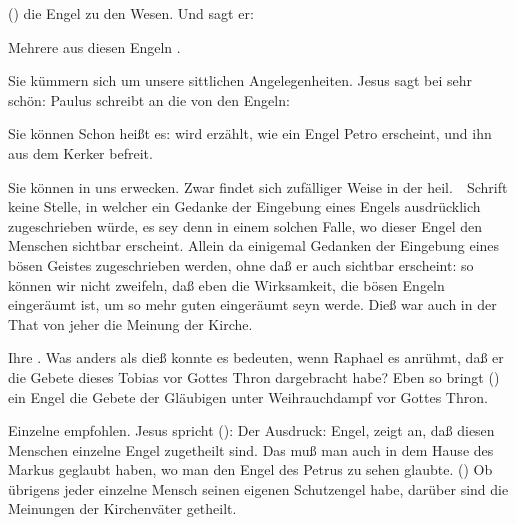 \begin{aufza}
\begin{aufzb}
() die Engel zu den  Wesen. Und  sagt er: 
\end{aufzb}
\item Mehrere aus diesen Engeln .
\begin{aufzb}
\item Sie kümmern sich um unsere sittlichen Angelegenheiten. Jesus sagt bei  sehr schön:  Paulus schreibt an die  von den Engeln: 
\item Sie können  Schon  heißt es:   wird erzählt, wie ein Engel Petro erscheint, und ihn aus dem Kerker befreit.
\item Sie können  in uns erwecken. Zwar findet sich zufälliger Weise in der heil.~\ Schrift keine Stelle, in welcher ein  Gedanke der Eingebung eines Engels ausdrücklich zugeschrieben würde, es sey denn in einem solchen Falle, wo dieser Engel den Menschen sichtbar erscheint. Allein da einigemal  Gedanken der Eingebung eines bösen Geistes zugeschrieben werden, ohne daß er auch sichtbar erscheint: so können wir nicht zweifeln, daß eben die Wirksamkeit, die bösen Engeln eingeräumt ist, um so mehr guten eingeräumt seyn werde. Dieß war auch in der That von jeher die Meinung der Kirche.
\item Ihre . Was anders als dieß konnte es bedeuten, wenn Raphael  es anrühmt, daß er die Gebete dieses Tobias vor Gottes Thron dargebracht habe? Eben so bringt () ein Engel die Gebete der Gläubigen unter Weihrauchdampf vor Gottes Thron.
\item Einzelne  empfohlen. Jesus spricht ():  Der Ausdruck:  Engel, zeigt an, daß diesen Menschen einzelne Engel zugetheilt sind. Das muß man auch in dem Hause des Markus geglaubt haben, wo man den Engel des Petrus zu sehen glaubte. () Ob übrigens jeder einzelne Mensch seinen eigenen Schutzengel habe, darüber sind die Meinungen der Kirchenväter getheilt.

\end{aufzb}
\end{aufza}
